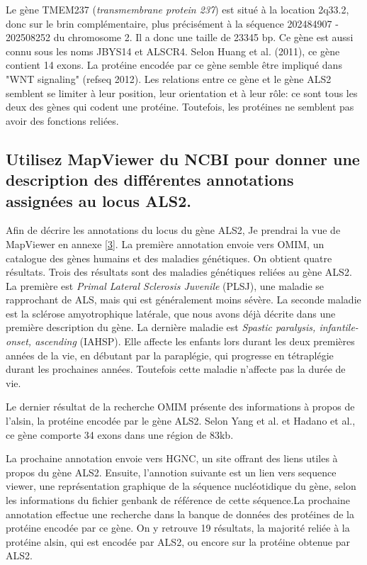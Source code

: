\documentclass[11pt]{article} %
\begin{document}
Le gène TMEM237 (\emph{transmembrane protein 237}) est situé à la location 2q33.2, donc sur le brin complémentaire, 
plus précisément à la séquence 202484907 - 202508252 du chromosome 2. Il a donc une taille de 23345 bp. 
Ce gène est aussi connu sous les noms JBYS14 et ALSCR4. Selon Huang et al. (2011), ce gène contient 14 
exons. La protéine encodée par ce gène semble être impliqué dans "WNT signaling" (refseq 2012). 
Les relations entre ce gène et le gène ALS2 semblent se limiter à leur position, leur orientation et à leur rôle:
ce sont tous les deux des gènes qui codent une protéine. Toutefois, les protéines ne semblent pas avoir des
fonctions reliées.

\subsection[Annotations du gène ALS2]{Utilisez MapViewer du NCBI pour donner une description des différentes annotations
assignées au locus ALS2.}

Afin de décrire les annotations du locus du gène ALS2, Je prendrai la vue de MapViewer en annexe \ref{3}. La première annotation envoie
vers OMIM, un catalogue des gènes humains et des maladies génétiques. On obtient quatre résultats. Trois des résultats
sont des maladies génétiques reliées au gène ALS2. La première est \emph{Primal Lateral Sclerosis Juvenile} (PLSJ), une maladie
se rapprochant de ALS, mais qui est généralement moins sévère. La seconde maladie est la sclérose amyotrophique latérale, que nous
avons déjà décrite dans une première description du gène. La dernière maladie est \emph{Spastic paralysis, infantile-onset, ascending}
 (IAHSP). Elle affecte les enfants lors durant les deux premières années de la vie, en débutant par la paraplégie, qui progresse
en tétraplégie durant les prochaines années. Toutefois cette maladie n'affecte pas la durée de vie. 

Le dernier résultat de la recherche OMIM présente des informations à propos de l'alsin, la protéine encodée par le gène ALS2. Selon
Yang et al. et Hadano et al., ce gène comporte 34 exons dans une région de 83kb.

La prochaine annotation envoie vers HGNC, un site offrant des liens utiles à propos du gène ALS2. Ensuite, l'annotion suivante 
est un lien vers sequence viewer, une représentation graphique de la séquence nucléotidique du gène, selon les informations
du fichier genbank de référence de cette séquence.La prochaine annotation effectue une recherche dans la banque de données
des protéines de la protéine encodée par ce gène. On y retrouve 19 résultats, la majorité reliée à la protéine alsin, qui est
encodée par ALS2, ou encore sur la protéine obtenue par ALS2. 
\end{document}
